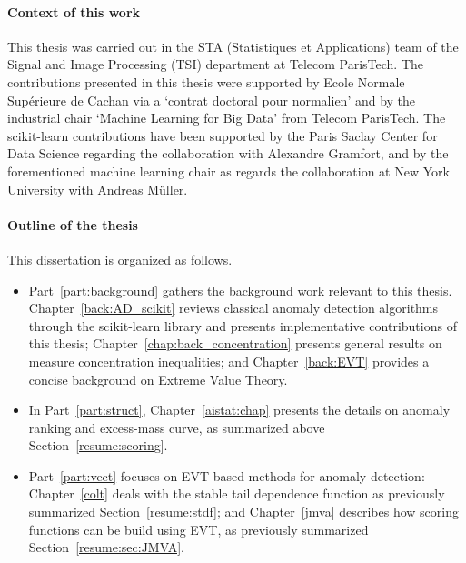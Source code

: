 \paragraph{Context of this work}
This thesis was carried out in the STA (Statistiques et Applications) team of the Signal and Image Processing (TSI) department at Telecom ParisTech. The contributions presented in this thesis were supported by Ecole Normale Supérieure de Cachan via a `contrat doctoral pour normalien' and by the industrial chair `Machine Learning for Big Data' from Telecom ParisTech. The scikit-learn contributions have been supported by the Paris Saclay Center for Data Science regarding the collaboration with Alexandre Gramfort, and by the forementioned machine learning chair as regards the collaboration at New York University with Andreas Müller.

\paragraph{Outline of the thesis}
This dissertation is organized as follows. 
\begin{itemize}
\item Part~\ref{part:background} gathers the background work relevant to this thesis.
Chapter~\ref{back:AD_scikit} reviews classical anomaly detection algorithms through the scikit-learn library and presents implementative contributions of this thesis; Chapter~\ref{chap:back_concentration} presents general results on measure concentration inequalities; and Chapter~\ref{back:EVT} provides a concise background on Extreme Value Theory.

\item In Part~\ref{part:struct}, Chapter~\ref{aistat:chap} presents the details on anomaly ranking and excess-mass curve, as summarized above Section~\ref{resume:scoring}.

\item Part~\ref{part:vect} focuses on EVT-based methods for anomaly detection: Chapter~\ref{colt} deals with the stable tail dependence function as previously summarized Section~\ref{resume:stdf}; and Chapter~\ref{jmva} describes how scoring functions can be build using EVT, as previously summarized Section~\ref{resume:sec:JMVA}.
\end{itemize}

